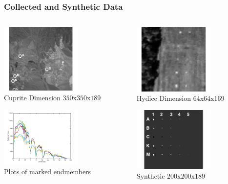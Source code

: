 \documentclass{beamer}
\begin{document}
\begin{frame}
\frametitle{Collected and Synthetic Data}
\begin{columns}
    \begin{column}{0.5\textwidth}
        \includegraphics[width=4cm,center]{cuprite_groundTruth}
        \centering
        \\ Cuprite Dimension \(350\)x\(350\)x\(189\)

        \includegraphics[width=4cm,center]{radiance}
        \centering
        \\ Plots of marked endmembers
    \end{column}
    \begin{column}{0.5\textwidth}
        \includegraphics[width=4cm,center]{hydice}
        \centering
        \\ Hydice Dimension \(64\)x\(64\)x\(169\)

        \includegraphics[width=4cm,center]{synthetic_labeled}
        \centering
        \\ Synthetic \(200\)x\(200\)x\(189\)
    \end{column}
\end{columns}
\end{frame}
\end{document}
